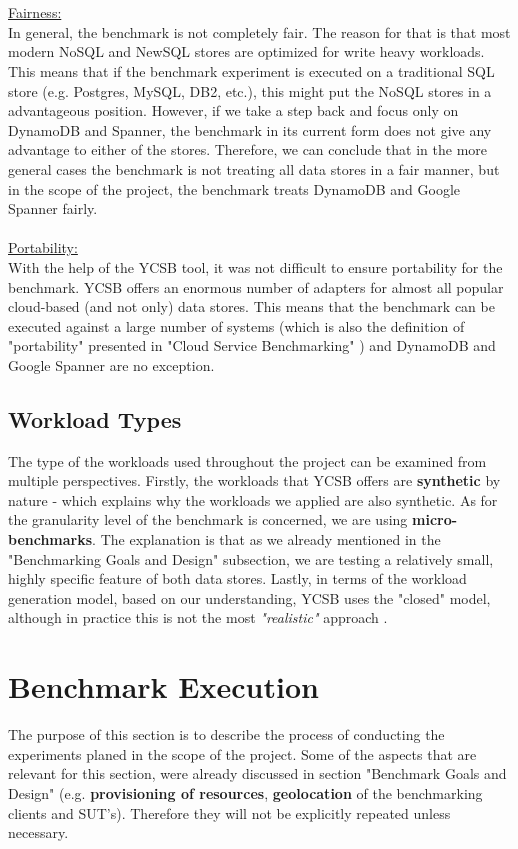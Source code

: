 \documentclass[letterpaper, 10 pt, conference]{ieeeconf}  %
\begin{document}
\\
\\
\underline{Fairness:}
\\
In general, the benchmark is not completely fair. The reason for that is that most modern NoSQL and NewSQL stores are optimized for write heavy workloads. This means that if the benchmark experiment is executed on a traditional SQL store (e.g. Postgres, MySQL, DB2, etc.), this might put the NoSQL stores in a advantageous position. However, if we take a step back and focus only on DynamoDB and Spanner, the benchmark in its current form does not give any advantage to either of the stores. Therefore, we can conclude that in the more general cases the benchmark is not treating all data stores in a fair manner, but in the scope of the project, the benchmark treats DynamoDB and Google Spanner fairly.
\\
\\
\underline{Portability:}
\\
With the help of the YCSB tool, it was not difficult to ensure portability for the benchmark. YCSB offers an enormous number of adapters for almost all popular cloud-based (and not only) data stores. This means that the benchmark can be executed against a large number of systems (which is also the definition of "portability" presented in "Cloud Service Benchmarking" \cite{StefanTaiBook}) and DynamoDB and Google Spanner are no exception.

\subsection{Workload Types}
The type of the workloads used throughout the project can be examined from multiple perspectives. Firstly, the workloads that YCSB offers are \textbf{synthetic} by nature - which explains why the workloads we applied are also synthetic. As for the granularity level of the benchmark is concerned, we are using \textbf{micro-benchmarks}. The explanation is that as we already mentioned in the "Benchmarking Goals and Design" subsection, we are testing a relatively small, highly specific feature of both data stores. Lastly, in terms of the workload generation model, based on our understanding, YCSB uses the "closed" model, although in practice this is not the most \textit{"realistic"} approach \cite{StefanTaiBook}.

\section{Benchmark Execution}
The purpose of this section is to describe the process of conducting the experiments planed in the scope of the project. Some of the aspects that are relevant for this section, were already discussed in section "Benchmark Goals and Design" (e.g. \textbf{provisioning of resources}, \textbf{geolocation} of the benchmarking clients and SUT's). Therefore they will not be explicitly repeated unless necessary.
\end{document}
